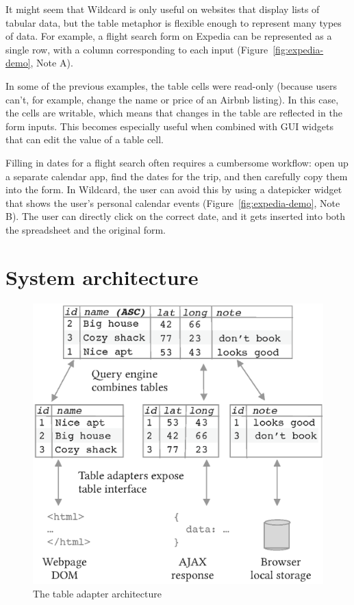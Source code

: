 \documentclass[sigplan,10pt,anonymous,review]{acmart}
\begin{document}
It might seem that Wildcard is only useful on websites that display
lists of tabular data, but the table metaphor is flexible enough to
represent many types of data. For example, a flight search form on
Expedia can be represented as a single row, with a column corresponding
to each input{ (Figure~\ref{fig:expedia-demo}, Note A)}.

In some of the previous examples, the table cells were read-only
(because users can't, for example, change the name or price of an Airbnb
listing). In this case, the cells are writable, which means that changes
in the table are reflected in the form inputs. This becomes especially
useful when combined with GUI widgets that can edit the value of a table
cell.

Filling in dates for a flight search often requires a cumbersome
workflow: open up a separate calendar app, find the dates for the trip,
and then carefully copy them into the form. In Wildcard, the user can
avoid this by using a datepicker widget that shows the user's personal
calendar events{ (Figure~\ref{fig:expedia-demo}, Note B)}. The user can
directly click on the correct date, and it gets inserted into both the
spreadsheet and the original form.

\hypertarget{sec:architecture}{%
\section{System architecture}\label{sec:architecture}}

\begin{figure}
\hypertarget{fig:table-adapter}{%
\centering
\includegraphics[width=\columnwidth]{media/table-adapter.eps}
\caption{The table adapter architecture}\label{fig:table-adapter}
}
\end{figure}
\end{document}
